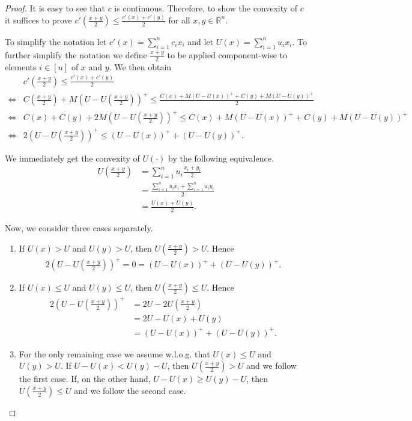 \begin{proof}
It is easy to see that $c$ is continuous. Therefore, to show the convexity of $c$ it suffices to prove $c'(\frac{x+y}{2}) \leq \frac{c'(x)+c'(y)}{2}$ for all $x, y \in \mathbb{R}^n$.

To simplify the notation let $c'(x) = \sum_{i=1}^n c_i x_i$ and let $U(x) = \sum_{i=1}^n u_i x_i$. To further simplify the notation we define $\frac{x+y}{2}$ to be applied component-wise to elements $i \in [n]$ of $x$ and $y$. We then obtain \small{
\begin{align*}
         &c'(\frac{x+y}{2}) \leq \frac{c'(x)+c'(y)}{2} \\
    \iff &C(\frac{x+y}{2}) + M(U - U(\frac{x+y}{2}))^+ \leq \frac{C(x) + M(U - U(x))^+ + C(y) + M(U - U(y))^+}{2} \\
    \iff &C(x) + C(y) + 2M(U - U(\frac{x+y}{2}))^+ \leq C(x) + M(U - U(x))^+ + C(y) + M(U - U(y))^+ \\
    \iff &2(U - U(\frac{x+y}{2}))^+ \leq (U - U(x))^+ + (U - U(y))^+.
\end{align*}
}\normalsize

We immediately get the convexity of $U(\cdot)$ by the following equivalence. \begin{align*}
    U(\frac{x+y}{2}) &= \sum_{i=1}^n u_i \frac{x_i + y_i}{2} \\
                     &= \frac{\sum_{i=1}^n u_i x_i + \sum_{i=1}^n u_i y_i}{2} \\
                     &= \frac{U(x) + U(y)}{2}.
\end{align*}

Now, we consider three cases separately.

\begin{enumerate}
    \item If $U(x) > U$ and $U(y) > U$, then $U(\frac{x+y}{2}) > U$. Hence \begin{align*}
        2(U - U(\frac{x+y}{2}))^+ = 0 = (U - U(x))^+ + (U - U(y))^+.
    \end{align*}
    \item If $U(x) \leq U$ and $U(y) \leq U$, then $U(\frac{x+y}{2}) \leq U$. Hence \begin{align*}
        2(U - U(\frac{x+y}{2}))^+ &= 2U - 2U(\frac{x+y}{2}) \\
                                  &= 2U - U(x) + U(y) \\
                                  &= (U - U(x))^+ + (U - U(y))^+.
    \end{align*}
    \item For the only remaining case we assume w.l.o.g. that $U(x) \leq U$ and $U(y) > U$. If $U - U(x) < U(y) - U$, then $U(\frac{x+y}{2}) > U$ and we follow the first case. If, on the other hand, $U - U(x) \geq U(y) - U$, then $U(\frac{x+y}{2}) \leq U$ and we follow the second case.\qedhere
\end{enumerate}
\end{proof}

